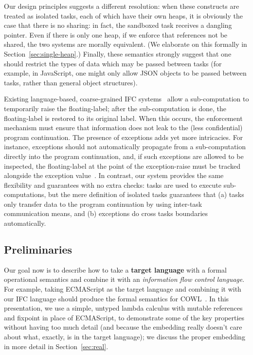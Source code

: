 Our design principles suggests a different resolution: when these
constructs are treated as isolated tasks, each of which have their own heaps, it
is obviously the case that there is no sharing: in fact, the sandboxed task receives a dangling pointer.  Even if there is only one heap, if we enforce that references
not be shared, the two systems are morally equivalent. (We elaborate on
this formally in Section~\ref{sec:single-heap}.)  Finally, these
semantics strongly suggest that one should restrict the types of
data which may be passed between tasks (for example, in JavaScript, one
might only allow JSON objects to be passed between tasks, rather than
general object structures).

Existing language-based, coarse-grained IFC
systems~\cite{Hritcu:2013:YIB:2497621.2498098,stefan:2012:arxiv-flexible}
allow a sub-computation to temporarily raise the floating-label; after
the sub-computation is done, the floating-label is restored to its
original label. When this occurs, the enforcement mechanism must
ensure that information does not leak to the (less confidential)
program continuation. The presence of exceptions adds yet more
intricacies.  For instance, exceptions should not automatically
propagate from a sub-computation directly into the program
continuation, and, if such exceptions are allowed to be inspected, the
floating-label at the point of the exception-raise must be tracked
alongside the exception value~\cite{Hritcu:2013:YIB:2497621.2498098,
stefan:2012:arxiv-flexiblea, Hedin:2012}.  In contrast, our system
provides the same flexibility and guarantees with no extra checks: tasks
are used to execute sub-computations, but the mere definition of
isolated tasks guarantees that (a) tasks only transfer data to the
program continuation by using inter-task communication means, and (b)
exceptions do cross tasks boundaries automatically.


\subsection{Preliminaries}

Our goal now is to
describe how to take a \textbf{{\color{red} target
language}} with a formal operational semantics and combine it with an
\textit{{\color{blue} information flow control language}}.  For example,
taking ECMAScript as the target language and combining it with our IFC
language should produce the formal semantics for COWL~\cite{swapi}.  In this
presentation, we use a simple, untyped lambda calculus with mutable
references and fixpoint in place of ECMAScript, to demonstrate some of the key
properties without having too much detail (and because the embedding really
doesn't care about what, exactly, is in the target language); we discuss the proper
embedding in more detail in Section~\ref{sec:real}.

